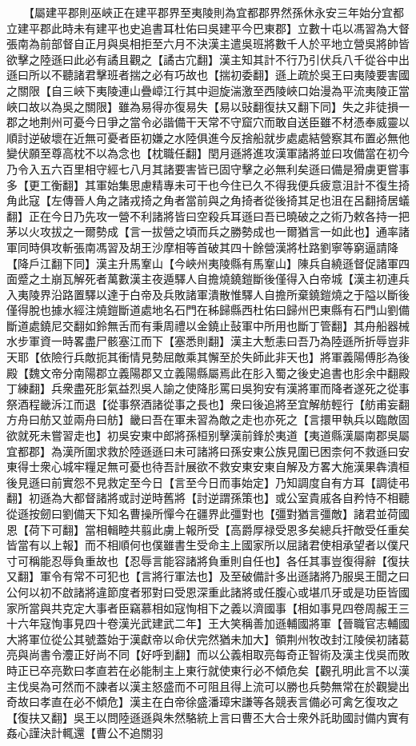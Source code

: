 　　【屬建平郡則巫峽正在建平郡界至夷陵則為宜都郡界然孫休永安三年始分宜都立建平郡此時未有建平也史追書耳杜佑曰吳建平今巴東郡】立數十屯以馮習為大督張南為前部督自正月與吳相拒至六月不決漢主遣吳班將數千人於平地立營吳將帥皆欲擊之陸遜曰此必有譎且觀之【譎古宂翻】漢主知其計不行乃引伏兵八千從谷中出遜曰所以不聽諸君擊班者揣之必有巧故也【揣初委翻】遜上疏於吳王曰夷陵要害國之關限【自三峽下夷陵連山疊嶂江行其中迴旋湍激至西陵峽口始漫為平流夷陵正當峽口故以為吳之關限】雖為易得亦復易失【易以䜴翻復扶又翻下同】失之非徒損一郡之地荆州可憂今日爭之當令必諧備干天常不守窟穴而敢自送臣雖不材憑奉威靈以順討逆破壞在近無可憂者臣初嫌之水陸俱進今反捨船就步處處結營察其布置必無他變伏願至尊高枕不以為念也【枕職任翻】閏月遜將進攻漢軍諸將並曰攻備當在初今乃令入五六百里相守經七八月其諸要害皆已固守擊之必無利矣遜曰備是猾虜更嘗事多【更工衡翻】其軍始集思慮精專未可干也今住已久不得我便兵疲意沮計不復生掎角此寇【左傳晉人角之諸戎掎之角者當前與之角掎者從後掎其足也沮在呂翻掎居蟻翻】正在今日乃先攻一營不利諸將皆曰空殺兵耳遜曰吾已曉破之之術乃敕各持一把茅以火攻拔之一爾勢成【言一拔營之頃而兵之勝勢成也一爾猶言一如此也】通率諸軍同時俱攻斬張南馮習及胡王沙摩相等首破其四十餘營漢將杜路劉寧等窮逼請降【降戶江翻下同】漢主升馬鞌山【今峽州夷陵縣有馬鞌山】陳兵自繞遜督促諸軍四面蹙之土崩瓦解死者萬數漢主夜遁驛人自擔燒鐃鎧斷後僅得入白帝城【漢主初連兵入夷陵界沿路置驛以達于白帝及兵敗諸軍潰散惟驛人自擔所棄鐃鎧燒之于隘以斷後僅得脫也據水經注燒鎧斷道處地名石門在秭歸縣西杜佑曰歸州巴東縣有石門山劉備斷道處鐃尼交翻如鈴無舌而有秉周禮以金鐃止鼔軍中所用也斷丁管翻】其舟船器械水步軍資一時畧盡尸骸塞江而下【塞悉則翻】漢主大慙恚曰吾乃為陸遜所折辱豈非天耶【依險行兵敵扼其衝情見勢屈敵乘其懈至於失師此非天也】將軍義陽傅肜為後殿【魏文帝分南陽郡立義陽郡又立義陽縣屬焉此在肜入蜀之後史追書也肜余中翻殿丁練翻】兵衆盡死肜氣益烈吳人諭之使降肜罵曰吳狗安有漢將軍而降者遂死之從事祭酒程畿泝江而退【從事祭酒諸從事之長也】衆曰後追將至宜解舫輕行【舫甫妄翻方舟曰舫又並兩舟曰舫】畿曰吾在軍未習為敵之走也亦死之【言擐甲執兵以臨敵固欲就死未嘗習走也】初吳安東中郎將孫桓别擊漢前鋒於夷道【夷道縣漢屬南郡吳屬宜都郡】為漢所圍求救於陸遜遜曰未可諸將曰孫安東公族見圍已困柰何不救遜曰安東得士衆心城牢糧足無可憂也待吾計展欲不救安東安東自解及方畧大施漢果犇潰桓後見遜曰前實怨不見救定至今日【言至今日而事始定】乃知調度自有方耳【調徒弔翻】初遜為大都督諸將或討逆時舊將【討逆謂孫策也】或公室貴戚各自矜恃不相聽從遜按劒曰劉備天下知名曹操所憚今在疆界此彊對也【彊對猶言彊敵】諸君並荷國恩【荷下可翻】當相輯睦共翦此虜上報所受【高爵厚禄受恩多矣總兵扞敵受任重矣皆當有以上報】而不相順何也僕雖書生受命主上國家所以屈諸君使相承望者以僕尺寸可稱能忍辱負重故也【忍辱言能容諸將負重則自任也】各任其事豈復得辭【復扶又翻】軍令有常不可犯也【言將行軍法也】及至破備計多出遜諸將乃服吳王聞之曰公何以初不啟諸將違節度者邪對曰受恩深重此諸將或任腹心或堪爪牙或是功臣皆國家所當與共克定大事者臣竊慕相如寇恂相下之義以濟國事【相如事見四卷周赧王三十六年寇恂事見四十卷漢光武建武二年】王大笑稱善加遜輔國將軍【晉職官志輔國大將軍位從公其號蓋始于漢獻帝以命伏完然猶未加大】領荆州牧改封江陵侯初諸葛亮與尚書令灋正好尚不同【好呼到翻】而以公義相取亮每奇正智術及漢主伐吳而敗時正已卒亮歎曰孝直若在必能制主上東行就使東行必不傾危矣【觀孔明此言不以漢主伐吳為可然而不諫者以漢主怒盛而不可阻且得上流可以勝也兵勢無常在於觀變出奇故曰孝直在必不傾危】漢主在白帝徐盛潘璋宋謙等各競表言備必可禽乞復攻之【復扶又翻】吳王以問陸遜遜與朱然駱統上言曰曹丕大合士衆外託助國討備内實有姦心謹決計輒還【曹公不追關羽